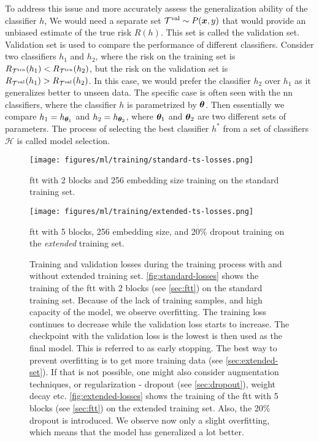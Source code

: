 To address this issue and more accurately assess the generalization ability of the classifier $h$, We would need a
separate set ${\mathcal{T}^\text{val}} \sim P(\bm{x}, y)$ that would provide an unbiased estimate of the true risk $R(h)$. This set is
called the validation set. Validation set is used to compare the performance of different
classifiers. Consider two classifiers $h_1$ and $h_2$, where the risk on the training set is $R_{\mathcal{T}^\text{trn}}(h_1) <
    R_{\mathcal{T}^\text{trn}}(h_2)$, but the risk on the validation set is $R_{\mathcal{T}^\text{val}}(h_1) > R_{\mathcal{T}^\text{val}}(h_2)$. In this case, we would prefer the
classifier $h_2$ over $h_1$ as it generalizes better to unseen data. The specific case is often seen with the \gls{nn}
classifiers, where the classifier $h$ is parametrized by ${\boldsymbol{\theta}}$. Then essentially we compare $h_1 = h_{{\boldsymbol{\theta}}_1}$ and
$h_2 = h_{{\boldsymbol{\theta}}_2}$, where ${\boldsymbol{\theta}}_1$ and ${\boldsymbol{\theta}}_2$ are two different sets of parameters. The process of selecting
the best classifier $h^*$ from a set of classifiers $\mathcal{H}$ is called model selection.

\begin{figure}[htb]
    \centering
    \begin{minipage}[t][\height][t]{0.47\textwidth}
        \texttt{[image: figures/ml/training/standard-ts-losses.png]}
        \caption{\acrshort{ftt} with 2 blocks and 256 embedding size training on the standard training set.}
        \label{fig:standard-losses}
    \end{minipage}
    \hfill
    \begin{minipage}[t][\height][t]{0.47\textwidth}
        \texttt{[image: figures/ml/training/extended-ts-losses.png]}
        \caption{\acrshort{ftt} with 5 blocks, 256 embedding size, and 20\% dropout training on the \emph{extended} training
            set.} \label{fig:extended-losses}
    \end{minipage}
    \caption[Training and validation losses during the training process with and without extended training set.]
    {Training and validation losses during the training process with and without extended training set.
        \autoref{fig:standard-losses} shows the training of the \acrshort{ftt} with 2 blocks (see \autoref{sec:ftt}) on the
        standard training set. Because of the lack of training samples, and high capacity of the model, we observe
        overfitting. The training loss continues to decrease while the validation loss starts to increase. The
        checkpoint with the validation loss is the lowest is then used as the final model. This is referred to as early
        stopping. The best way to prevent overfitting is to get more training data (see
        \autoref{sec:extended-set}). If that is not possible, one might also consider augmentation techniques, or
        regularization - dropout (see \autoref{sec:dropout}), weight decay etc. \autoref{fig:extended-losses} shows the
        training of the \acrshort{ftt} with 5 blocks (see \autoref{sec:ftt}) on the extended training set. Also, the 20\%
        dropout is introduced. We observe now only a slight overfitting, which means that the model has generalized
        a lot better.}
    \label{fig:losses}
\end{figure}


